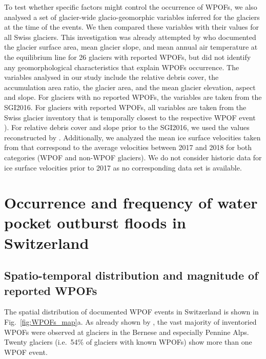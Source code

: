 To test whether specific factors might control the occurrence of WPOFs, we also analysed a set of glacier-wide glacio-geomorphic variables inferred for the glaciers at the time of the events. We then compared these variables with their values for all Swiss glaciers. This investigation was already attempted by \cite{Haeberli1983} who documented the glacier surface area, mean glacier slope, and mean annual air temperature at the equilibrium line for 26 glaciers with reported WPOFs, but did not identify any geomorphological characteristics that explain WPOFs occurrence. The variables analysed in our study include the relative debris cover, the accumulation area ratio, the glacier area, and the mean glacier elevation, aspect and slope. For glaciers with no reported WPOFs, the variables are taken from the SGI2016. For glaciers with reported WPOFs, all variables are taken from the Swiss glacier inventory that is temporally closest to the respective WPOF event \citep[SGI1850, SGI1973 and SGI2016;][]{Muller&al1976,Maisch&al2000,Linsbauer&al2021}). For relative debris cover and slope prior to the SGI2016, we used the values reconstructed by \cite{Altrock2022}. Additionally, we analyzed the mean ice surface velocities taken from \cite{Millan&al2022} that correspond to the average velocities between 2017 and 2018 for both categories (WPOF and non-WPOF glaciers). We do not consider historic data for ice surface velocities prior to 2017 as no corresponding data set is available.


\section{ Occurrence and frequency of water pocket outburst floods in Switzerland}
\label{sec:inventary}

\subsection{ Spatio-temporal distribution and magnitude of reported WPOFs}
\label{Sec:Spatio_temporal}

The spatial distribution of documented WPOF events in Switzerland is shown in Fig.~\ref{fig:WPOFs_map}a. As already shown by \citet{Haeberli1983}, the vast majority of inventoried WPOFs were observed at glaciers in the Bernese and especially Pennine Alps. Twenty glaciers (i.e.\ 54\% of glaciers with known WPOFs) show more than one WPOF event. 


